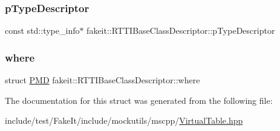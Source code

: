 \subsubsection{\texorpdfstring{pTypeDescriptor}{pTypeDescriptor}}
{\footnotesize\ttfamily const std\+::type\+\_\+info$\ast$ fakeit\+::\+R\+T\+T\+I\+Base\+Class\+Descriptor\+::p\+Type\+Descriptor}

\mbox{\label{structfakeit_1_1RTTIBaseClassDescriptor_abfe212c73a7876cd400180cf8326d353}} 
\subsubsection{\texorpdfstring{where}{where}}
{\footnotesize\ttfamily struct \mbox{\hyperlink{structfakeit_1_1PMD}{P\+MD}} fakeit\+::\+R\+T\+T\+I\+Base\+Class\+Descriptor\+::where}



The documentation for this struct was generated from the following file\+:\begin{DoxyCompactItemize}
\item 
include/test/\+Fake\+It/include/mockutils/mscpp/\mbox{\hyperlink{mscpp_2VirtualTable_8hpp}{Virtual\+Table.\+hpp}}\end{DoxyCompactItemize}
